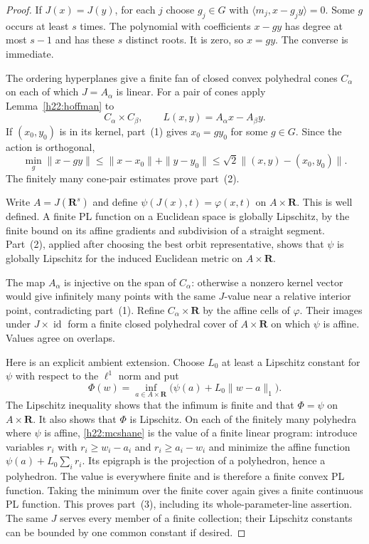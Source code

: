 \documentclass[11pt,a4paper]{article}
\theoremstyle{definition}
\theoremstyle{remark}
\newcommand{\R}{\mathbf R}
\newcommand{\Id}{\operatorname{id}}
\begin{document}
\begin{proof}
If $J(x)=J(y)$, for each $j$ choose $g_j\in G$ with
$\langle m_j,x-g_jy\rangle=0$. Some $g$ occurs at least $s$ times.
The polynomial with coefficients $x-gy$ has degree at most $s-1$ and
has these $s$ distinct roots. It is zero, so $x=gy$. The converse is
immediate.

The ordering hyperplanes give a finite fan of closed convex polyhedral
cones $C_\alpha$ on each of which $J=A_\alpha$ is linear. For a pair
of cones apply Lemma~\ref{h22:hoffman} to
\[
 C_\alpha\times C_\beta,
 \qquad L(x,y)=A_\alpha x-A_\beta y.
\]
If $(x_0,y_0)$ is in its kernel, part~(1) gives $x_0=gy_0$ for
some $g\in G$. Since the action is orthogonal,
\[
 \min_g\|x-gy\|\leq
 \|x-x_0\|+\|y-y_0\|
 \leq\sqrt2\|(x,y)-(x_0,y_0)\|.
\]
The finitely many cone-pair estimates prove part~(2).

Write $A=J(\R^s)$ and define $\psi(J(x),t)=\varphi(x,t)$ on
$A\times\R$. This is well defined. A finite PL function on a Euclidean
space is globally Lipschitz, by the finite bound on its affine gradients
and subdivision of a straight segment. Part~(2), applied after choosing
the best orbit representative, shows that $\psi$ is globally Lipschitz
for the induced Euclidean metric on $A\times\R$.

The map $A_\alpha$ is injective on the span of $C_\alpha$: otherwise a
nonzero kernel vector would give infinitely many points with the same
$J$-value near a relative interior point, contradicting part~(1).
Refine $C_\alpha\times\R$ by the affine cells of $\varphi$. Their
images under $J\times\Id$ form a finite closed polyhedral cover of
$A\times\R$ on which $\psi$ is affine. Values agree on overlaps.

Here is an explicit ambient extension. Choose $L_0$ at least a
Lipschitz constant for $\psi$ with respect to the $\ell^1$ norm and put
\[
 \Phi(w)=\inf_{a\in A\times\R}
              \bigl(\psi(a)+L_0\|w-a\|_1\bigr).
\tag{TD1}\label{h22:mcshane}
\]
The Lipschitz inequality shows that the infimum is finite and that
$\Phi=\psi$ on $A\times\R$. It also shows that $\Phi$ is Lipschitz.
On each of the finitely many polyhedra where $\psi$ is affine, \eqref{h22:mcshane} is
the value of a finite linear program: introduce variables $r_i$ with
$r_i\geq w_i-a_i$ and $r_i\geq a_i-w_i$ and minimize the affine
function $\psi(a)+L_0\sum_i r_i$. Its epigraph is the projection of a
polyhedron, hence a polyhedron. The value is everywhere finite and is
therefore a finite convex PL function. Taking the minimum over the
finite cover again gives a finite continuous PL function. This proves
part~(3), including its whole-parameter-line assertion. The same $J$
serves every member of a finite collection; their Lipschitz constants
can be bounded by one common constant if desired.
\end{proof}
\end{document}
